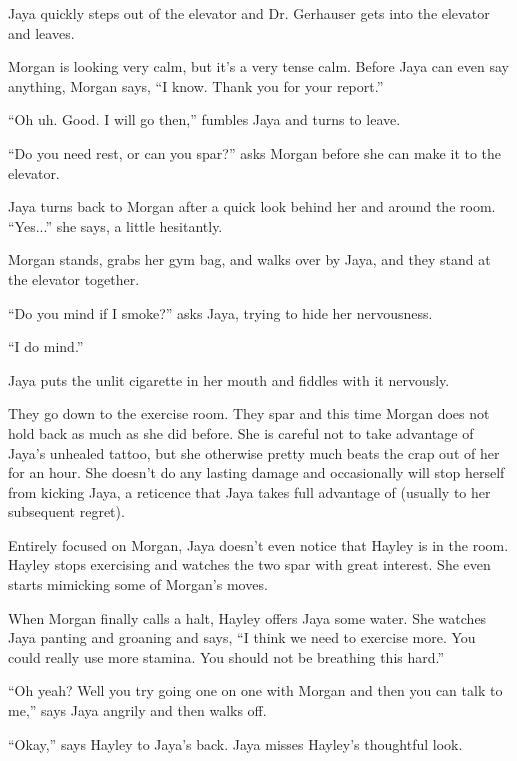 Jaya quickly steps out of the elevator and Dr. Gerhauser gets into the elevator and leaves.



Morgan is looking very calm, but it's a very tense calm.  Before Jaya can even say anything, Morgan says, ``I know.  Thank you for your report.''

``Oh uh.  Good.  I will go then,'' fumbles Jaya and turns to leave.

``Do you need rest, or can you spar?'' asks Morgan before she can make it to the elevator.

Jaya turns back to Morgan after a quick look behind her and around the room.  ``Yes...'' she says, a little hesitantly.

Morgan stands, grabs her gym bag, and walks over by Jaya, and they stand at the elevator together.  

``Do you mind if I smoke?'' asks Jaya, trying to hide her nervousness.

``I do mind.''

Jaya puts the unlit cigarette in her mouth and fiddles with it nervously.



They go down to the exercise room.  They spar and this time Morgan does not hold back as much as she did before.  She is careful not to take advantage of Jaya's unhealed tattoo, but she otherwise pretty much beats the crap out of her for an hour.  She doesn't do any lasting damage and occasionally will stop herself from kicking Jaya, a reticence that Jaya takes full advantage of (usually to her subsequent regret).



Entirely focused on Morgan, Jaya doesn't even notice that Hayley is in the room.  Hayley stops exercising and watches the two spar with great interest.  She even starts mimicking some of Morgan's moves. 



When Morgan finally calls a halt, Hayley offers Jaya some water.  She watches Jaya panting and groaning and says, ``I think we need to exercise more.  You could really use more stamina.  You should not be breathing this hard.''

``Oh yeah?  Well you try going one on one with Morgan and then you can talk to me,'' says Jaya angrily and then walks off.

``Okay,'' says Hayley to Jaya's back.  Jaya misses Hayley's thoughtful look.



